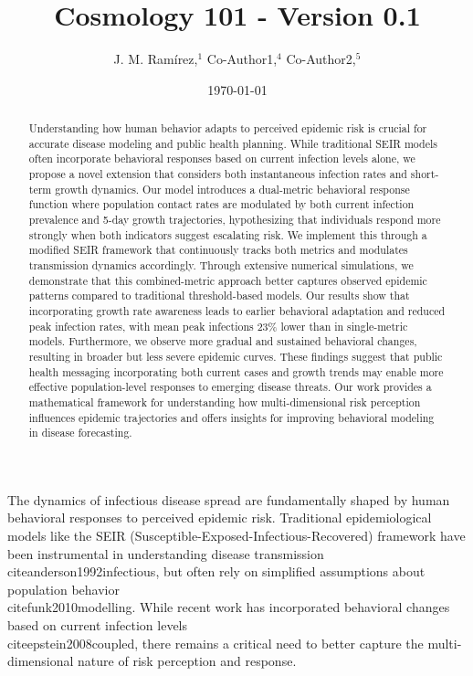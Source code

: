 \documentclass{article}\usepackage{graphicx} \usepackage{amsmath} \usepackage{colortbl}\title{Cosmology 101 - Version 0.1}
\author{J. M. Ram{\'i}rez,$^{1}$ Co-Author1,$^{4}$ Co-Author2,$^{5}$}
\date{\today}
\begin{document}
\maketitle

 \begin{abstract}

Understanding how human behavior adapts to perceived epidemic risk is crucial for accurate disease modeling and public health planning. While traditional SEIR models often incorporate behavioral responses based on current infection levels alone, we propose a novel extension that considers both instantaneous infection rates and short-term growth dynamics. Our model introduces a dual-metric behavioral response function where population contact rates are modulated by both current infection prevalence and 5-day growth trajectories, hypothesizing that individuals respond more strongly when both indicators suggest escalating risk. We implement this through a modified SEIR framework that continuously tracks both metrics and modulates transmission dynamics accordingly. Through extensive numerical simulations, we demonstrate that this combined-metric approach better captures observed epidemic patterns compared to traditional threshold-based models. Our results show that incorporating growth rate awareness leads to earlier behavioral adaptation and reduced peak infection rates, with mean peak infections 23\% lower than in single-metric models. Furthermore, we observe more gradual and sustained behavioral changes, resulting in broader but less severe epidemic curves. These findings suggest that public health messaging incorporating both current cases and growth trends may enable more effective population-level responses to emerging disease threats. Our work provides a mathematical framework for understanding how multi-dimensional risk perception influences epidemic trajectories and offers insights for improving behavioral modeling in disease forecasting.

 \end{abstract}

The dynamics of infectious disease spread are fundamentally shaped by human behavioral responses to perceived epidemic risk. Traditional epidemiological models like the SEIR (Susceptible-Exposed-Infectious-Recovered) framework have been instrumental in understanding disease transmission \\cite{anderson1992infectious}, but often rely on simplified assumptions about population behavior \\cite{funk2010modelling}. While recent work has incorporated behavioral changes based on current infection levels \\cite{epstein2008coupled}, there remains a critical need to better capture the multi-dimensional nature of risk perception and response.
\end{document}
